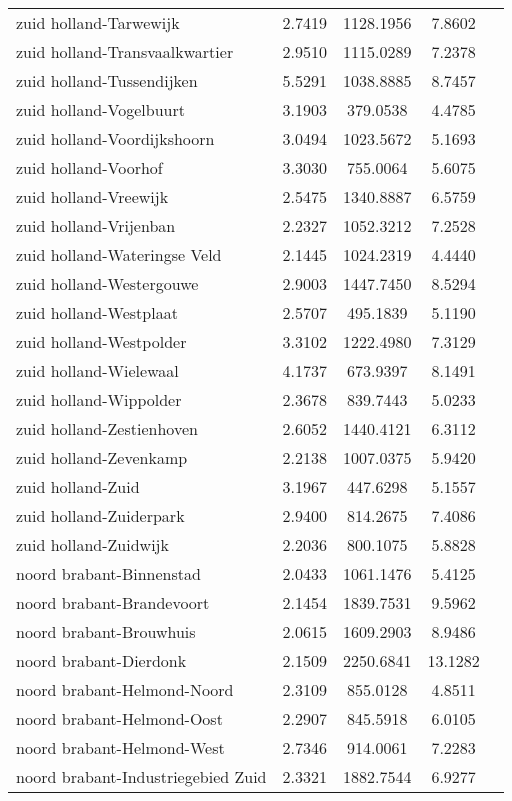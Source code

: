 \begin{longtable}{llccc}
zuid holland-Tarwewijk & 2.7419 & 1128.1956 & 7.8602 \\
zuid holland-Transvaalkwartier & 2.9510 & 1115.0289 & 7.2378 \\
zuid holland-Tussendijken & 5.5291 & 1038.8885 & 8.7457 \\
zuid holland-Vogelbuurt & 3.1903 & 379.0538 & 4.4785 \\
zuid holland-Voordijkshoorn & 3.0494 & 1023.5672 & 5.1693 \\
zuid holland-Voorhof & 3.3030 & 755.0064 & 5.6075 \\
zuid holland-Vreewijk & 2.5475 & 1340.8887 & 6.5759 \\
zuid holland-Vrijenban & 2.2327 & 1052.3212 & 7.2528 \\
zuid holland-Wateringse Veld & 2.1445 & 1024.2319 & 4.4440 \\
zuid holland-Westergouwe & 2.9003 & 1447.7450 & 8.5294 \\
zuid holland-Westplaat & 2.5707 & 495.1839 & 5.1190 \\
zuid holland-Westpolder & 3.3102 & 1222.4980 & 7.3129 \\
zuid holland-Wielewaal & 4.1737 & 673.9397 & 8.1491 \\
zuid holland-Wippolder & 2.3678 & 839.7443 & 5.0233 \\
zuid holland-Zestienhoven & 2.6052 & 1440.4121 & 6.3112 \\
zuid holland-Zevenkamp & 2.2138 & 1007.0375 & 5.9420 \\
zuid holland-Zuid & 3.1967 & 447.6298 & 5.1557 \\
zuid holland-Zuiderpark & 2.9400 & 814.2675 & 7.4086 \\
zuid holland-Zuidwijk & 2.2036 & 800.1075 & 5.8828 \\
noord brabant-Binnenstad & 2.0433 & 1061.1476 & 5.4125 \\
noord brabant-Brandevoort & 2.1454 & 1839.7531 & 9.5962 \\
noord brabant-Brouwhuis & 2.0615 & 1609.2903 & 8.9486 \\
noord brabant-Dierdonk & 2.1509 & 2250.6841 & 13.1282 \\
noord brabant-Helmond-Noord & 2.3109 & 855.0128 & 4.8511 \\
noord brabant-Helmond-Oost & 2.2907 & 845.5918 & 6.0105 \\
noord brabant-Helmond-West & 2.7346 & 914.0061 & 7.2283 \\
noord brabant-Industriegebied Zuid & 2.3321 & 1882.7544 & 6.9277 \\

\end{longtable}
